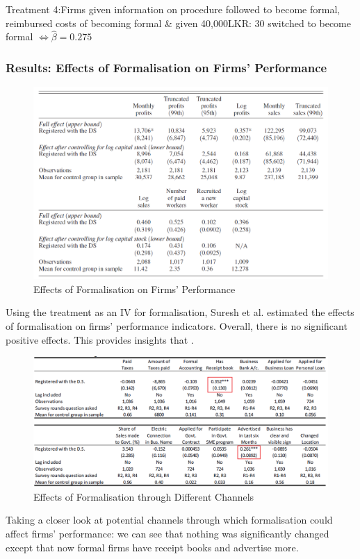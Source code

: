 Treatment 4:Firms given information on procedure followed to become formal, reimbursed costs of becoming formal \& given 40,000LKR: 30 switched to become formal    $\Leftrightarrow\hat{\beta}= 0.275$          

            
        \subsubsection{Results: Effects of Formalisation on Firms' Performance}
            \begin{figure}[H]
                \centering
                \includegraphics[width=5.5in]{images/ch5/SL formal treatment 3.png}
                \caption{Effects of Formalisation on Firms' Performance}
            \end{figure}
            Using the treatment as an IV for formalisation, Suresh et al. estimated the effects of formalisation on firms' performance indicators. Overall, there is no significant positive effects. This provides insights that .
            \begin{figure}[H]
                \centering
                \includegraphics[width=5.5in]{images/ch5/SL formal treatment 4.png}
                \caption{Effects of Formalisation through Different Channels}
            \end{figure}
            Taking a closer look at potential channels through which formalisation could affect firms' performance: we can see that nothing was significantly changed except that now formal firms have receipt books and advertise more.
        
